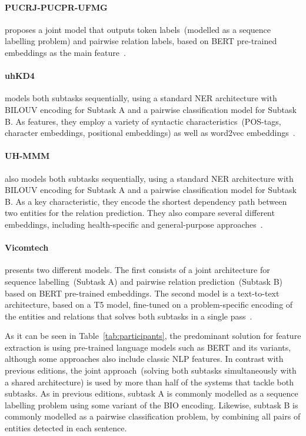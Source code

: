 \documentclass[a4paper,11pt,twocolumn,twoside]{article}
\begin{document}
  \paragraph{PUCRJ-PUCPR-UFMG} proposes a joint model that outputs token labels~(modelled as a sequence labelling problem) and pairwise relation labels, based on BERT pre-trained embeddings as the main feature~\cite{lucas2021}.

  \paragraph{uhKD4} models both subtasks sequentially, using a standard NER architecture with BILOUV encoding for Subtask A and a pairwise classification model for Subtask B. As features, they employ a variety of syntactic characteristics~(POS-tags, character embeddings, positional embeddings) as well as word2vec embeddings~\cite{uhKD42021}.

  \paragraph{UH-MMM} also models both subtasks sequentially, using a standard NER architecture with BILOUV encoding for Subtask A and a pairwise classification model for Subtask B. As a key characteristic, they encode the shortest dependency path between two entities for the relation prediction. They also compare several different embeddings, including health-specific and general-purpose approaches~\cite{uhmmm2021}.

  \paragraph{Vicomtech} presents two different models. The first consists of a joint architecture for sequence labelling~(Subtask A) and pairwise relation prediction~(Subtask B) based on BERT pre-trained embeddings. The second model is a text-to-text architecture, based on a T5 model, fine-tuned on a problem-specific encoding of the entities and relations that solves both subtasks in a single pass~\cite{vicomtech2021}.

As it can be seen in Table~\ref{tab:participants}, the predominant solution for feature extraction is using pre-trained language models such as BERT and its variants, although some approaches also include classic NLP features.
In contrast with previous editions, the joint approach~(solving both subtasks simultaneously with a shared architecture) is used by more than half of the systems that tackle both subtasks.
As in previous editions, subtask A is commonly modelled as a sequence labelling problem using some variant of the BIO encoding.
Likewise, subtask B is commonly modelled as a pairwise classification problem, by combining all pairs of entities detected in each sentence.
\end{document}
